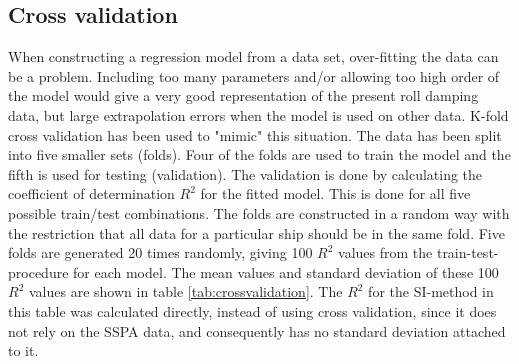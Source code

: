 \subsection{Cross validation}
\label{se:cross_validation}
When constructing a regression model from a data set, over-fitting the data can be a problem. Including too many parameters and/or allowing too high order of the model would give a very good representation of the present roll damping data, but large extrapolation errors when the model is used on other data. K-fold cross validation has been used to "mimic" this situation. The data has been split into five smaller sets (folds). Four of the folds are used to train the model and the fifth is used for testing (validation). The validation is done by calculating the coefficient of determination $R^2$ for the fitted model. This is done for all five possible train/test combinations. 
The folds are constructed in a random way with the restriction that all data for a particular ship should be in the same fold. Five folds are generated 20 times randomly, giving 100 $R^2$ values from the train-test-procedure for each model. The mean values and standard deviation of these 100 $R^2$ values are shown in table \ref{tab:crossvalidation}. The $R^2$ for the SI-method in this table was calculated directly, instead of using cross validation, since it does not rely on the SSPA data, and consequently has no standard deviation attached to it.




